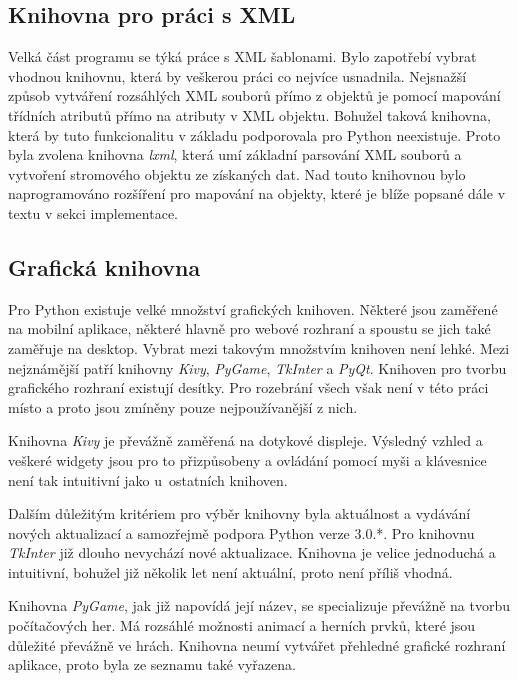 \documentclass[thesis=B,czech]{resources/FITthesis}[2012/06/26]
\begin{document}
\subsection{Knihovna pro práci s XML}

Velká část programu se týká práce s XML šablonami. Bylo zapotřebí vybrat vhodnou knihovnu, která by veškerou práci co nejvíce usnadnila. Nejsnažší způsob vytváření rozsáhlých XML souborů přímo z objektů je pomocí mapování třídních atributů přímo na atributy v XML objektu. Bohužel taková knihovna, která by tuto funkcionalitu v základu podporovala pro Python neexistuje. Proto byla zvolena knihovna \textit{lxml}\cite{lxml}, která umí základní parsování XML souborů a vytvoření stromového objektu ze získaných dat. Nad touto knihovnou bylo naprogramováno rozšíření pro mapování na objekty, které je blíže popsané dále v textu v sekci implementace.



\subsection{Grafická knihovna}
Pro Python existuje velké množství grafických knihoven. Některé jsou zaměřené na mobilní aplikace, některé hlavně pro webové rozhraní a spoustu se jich také zaměřuje na desktop. Vybrat mezi takovým množstvím knihoven není lehké. Mezi nejznámější patří knihovny \textit{Kivy}, \textit{PyGame}, \textit{TkInter} a \textit{PyQt}. Knihoven pro tvorbu grafického rozhraní existují desítky. Pro rozebrání všech však není v této práci místo a proto jsou zmíněny pouze nejpoužívanější z nich.\par

Knihovna \textit{Kivy} je převážně zaměřená na dotykové displeje. Výsledný vzhled a veškeré widgety jsou pro to přizpůsobeny a ovládání pomocí myši a klávesnice není tak intuitivní jako u~ostatních knihoven.\par

Dalším důležitým kritériem pro výběr knihovny byla aktuálnost a vydávání nových aktualizací a samozřejmě podpora Python verze 3.0.*. Pro knihovnu \textit{TkInter} již dlouho nevychází nové aktualizace. Knihovna je velice jednoduchá a intuitivní, bohužel již několik let není aktuální, proto není příliš vhodná. \par

Knihovna \textit{PyGame}, jak již napovídá její název, se specializuje převážně na tvorbu počítačových her. Má rozsáhlé možnosti animací a herních prvků, které jsou důležité převážně ve hrách. Knihovna neumí vytvářet přehledné grafické rozhraní aplikace, proto byla ze seznamu také vyřazena.\par
\end{document}
